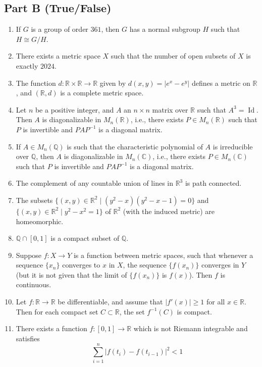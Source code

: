 \documentclass[11pt, a4paper]{article}
\begin{document}
\subsection*{Part B (True/False)}
\begin{enumerate}
  \item If $G$ is a group of order $361$, then $G$ has a normal subgroup $H$ such that $H \cong G/H$.
  \item There exists a metric space $X$ such that the number of open subsets of $X$ is exactly $2024$.
  \item The function $d: \mathbb{R} \times \mathbb{R} \to \mathbb{R}$ given by $d(x, y) = |e^x - e^y|$ defines a metric on $\mathbb{R}$, and $(\mathbb{R}, d)$ is a complete metric space.
  \item Let $n$ be a positive integer, and $A$ an $n \times n$ matrix over $\mathbb{R}$ such that $A^3 = \operatorname{Id}$. Then $A$ is diagonalizable in $M_n(\mathbb{R})$, i.e., there exists $P \in M_n(\mathbb{R})$ such that $P$ is invertible and $PAP^{-1}$ is a diagonal matrix.
  \item If $A \in M_n(\mathbb{Q})$ is such that the characteristic polynomial of $A$ is irreducible over $\mathbb{Q}$, then $A$ is diagonalizable in $M_n(\mathbb{C})$, i.e., there exists $P \in M_n(\mathbb{C})$ such that $P$ is invertible and $PAP^{-1}$ is a diagonal matrix.
  \item The complement of any countable union of lines in $\mathbb{R}^3$ is path connected.
  \item The subsets $\{(x, y) \in \mathbb{R}^2 \mid (y^2 - x)(y^2 - x - 1) = 0\}$ and $\{(x, y) \in \mathbb{R}^2 \mid y^2 - x^2 = 1\}$ of $\mathbb{R}^2$ (with the induced metric) are homeomorphic.
  \item $\mathbb{Q} \cap [0,1]$ is a compact subset of $\mathbb{Q}$.
  \item Suppose $f: X \to Y$ is a function between metric spaces, such that whenever a sequence $\{x_n\}$ converges to $x$ in $X$, the sequence $\{f(x_n)\}$ converges in $Y$ (but it is not given that the limit of $\{f(x_n)\}$ is $f(x)$). Then $f$ is continuous.
  \item Let $f: \mathbb{R} \to \mathbb{R}$ be differentiable, and assume that $|f'(x)| \ge 1$ for all $x \in \mathbb{R}$. Then for each compact set $C \subset \mathbb{R}$, the set $f^{-1}(C)$ is compact.
  \item There exists a function $f: [0,1] \to \mathbb{R}$ which is not Riemann integrable and satisfies
  \[
    \sum_{i=1}^n |f(t_i) - f(t_{i-1})|^2 < 1
\]
\end{enumerate}
\end{document}
